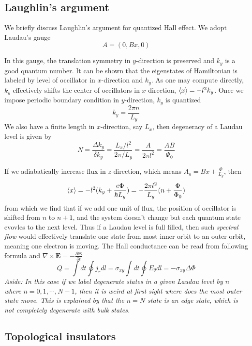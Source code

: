 \documentclass[12pt,a4paper]{article}
\numberwithin{equation}{section}
\begin{document}
\subsection*{Laughlin's argument}
We briefly discuss Laughlin's argument for quantized Hall effect. 
We adopt Laudau's gauge \[A = (0,Bx,0)\]

In this gauge, the translation symmetry in $y$-direction is preserved and $k_y$ is a good quantum number. It can be shown that the eigenstates of Hamiltonian is labeled by 
level of occillator in $x$-direction and $k_y$. As one may compute directly, $k_y$ effectively shifts the center of occillators in $x$-direction, $\expval{x} = -l^2 k_y$.
Once we impose periodic boundary condition in $y$-direction, $k_y$ is quantized
\[ k_y = \frac{2\pi n}{L_y}\]
We also have a finite length in $x$-direction, say $L_x$, then degeneracy of a Laudau level is given by
\[ N = \frac{\Delta k_y}{\delta k_y} = \frac{L_x/l^2}{2\pi/L_y} = \frac{A}{2\pi l^2} = \frac{AB}{\Phi_0}\]

If we adiabatically increase flux in $z$-direction, which means $A_y = Bx + \frac{\Phi}{L_y}$, then
\[\expval{x} = -l^2(k_y + \frac{e\Phi}{\hbar L_y}) = -\frac{2\pi l^2}{L_y}(n + \frac{\Phi}{\Phi_0})\]
from which we find that if we add one unit of flux, the position of occillator is shifted from $n$ to $n+1$, and the system doesn't change but each quantum state evovles to the next level.
Thus if a Laudau level is full filled, then such \textit{spectral flow} would effectively translate one state from most inner orbit to an outer orbit, meaning one electron is moving. 
The Hall conductance can be read from following formula and $\nabla\times \mathbf{E} = -\frac{\partial \mathbf{B}}{\partial t}$
\[Q = \int dt \oint j_r dl = \sigma_{xy}\int dt \oint E_\theta dl = -\sigma_{xy}\Delta\Phi\]
\textit{Aside: In this case if we label degenerate states in a given Laudau level by $n$ where $n=0,1,\cdots,N-1$, then it is weird at first sight where does the most outer state move. This is explained by that the $n=N$ state is
an edge state, which is not completely degenerate with bulk states.}

\subsection{Topological insulators}
\end{document}
